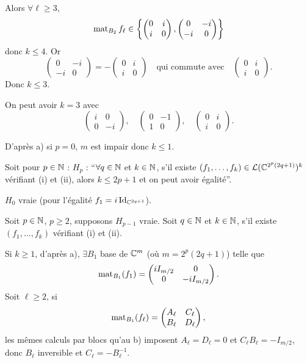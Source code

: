 \begin{solution}
Alors $\forall \ell\geq3$,
\[
\operatorname{mat}_{B_2}f_\ell\in
\left\{
\begin{pmatrix}0&i\\ i&0\end{pmatrix},
\begin{pmatrix}0&-i\\ -i&0\end{pmatrix}
\right\}
\]
donc $k\leq4$. Or
\[
\begin{pmatrix}0&-i\\-i&0\end{pmatrix}
=-\begin{pmatrix}0&i\\i&0\end{pmatrix}
\quad\text{qui commute avec}\quad
\begin{pmatrix}0&i\\i&0\end{pmatrix}.
\]
Donc $k\leq3$.

On peut avoir $k=3$ avec
\[
\begin{pmatrix}i&0\\0&-i\end{pmatrix},\quad
\begin{pmatrix}0&-1\\1&0\end{pmatrix},\quad
\begin{pmatrix}0&i\\ i&0\end{pmatrix}.
\]

D'après a) si $p=0$, $m$ est impair donc $k\leq1$.

Soit pour $p\in\mathbb N$ : $H_p$ : ``$\forall q\in\mathbb N$ et $k\in\mathbb N$, s'il existe
$(f_1,\dots,f_k)\in\mathcal L(\mathbb C^{2^p(2q+1)})^k$ vérifiant (i) et (ii), alors
$k\leq2p+1$ et on peut avoir égalité''.

$H_0$ vraie (pour l'égalité $f_1=i\operatorname{Id}_{\mathbb C^{2q+1}}$).

Soit $p\in\mathbb N$, $p\geq2$, supposons $H_{p-1}$ vraie.
Soit $q\in\mathbb N$ et $k\in\mathbb N$, s'il existe $(f_1,\dots,f_k)$ vérifiant (i) et (ii).

Si $k\geq1$, d'après a), $\exists B_1$ base de $\mathbb C^m$ (où
$m=2^p(2q+1)$) telle que
\[
\operatorname{mat}_{B_1}(f_1)=
\begin{pmatrix}iI_{m/2}&0\\0&-iI_{m/2}\end{pmatrix}.
\]
Soit $\ell\geq2$, si
\[
\operatorname{mat}_{B_1}(f_\ell)=\begin{pmatrix}A_\ell&C_\ell\\B_\ell&D_\ell\end{pmatrix},
\]
les mêmes calculs par blocs qu'au b) imposent
$A_\ell=D_\ell=0$ et $C_\ell B_\ell=-I_{m/2}$, donc $B_\ell$ inversible et
$C_\ell=-B_\ell^{-1}$.


\end{solution}
